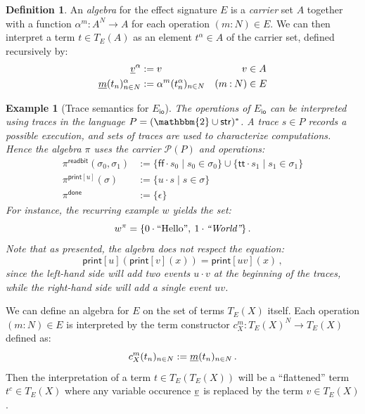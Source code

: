 \documentclass[11pt,oneside,draft]{book}
\newtheorem{example}[theorem]{Example}
\theoremstyle{definition}
\newtheorem{definition}[theorem]{Definition}
\newcommand{\kw}[1]{\ensuremath{ \mathsf{#1} }}
\newcommand{\ul}[1]{%
  \underline{\smash{#1}}
}
\begin{document}
\begin{definition} \label{def:algebra} %
An \emph{algebra}
for the effect signature $E$
is a \emph{carrier} set $A$
together with a function
$\alpha^m : A^N \rightarrow A$
for each operation $(m \mathbin{:} N) \in E$.
We can then interpret
a term $t \in T_E(A)$
as an element $t^\alpha \in A$ of the carrier set,
defined recursively by:
\begin{align*}
  \ul{v}^\alpha &:= v & v &\in A \\
  \ul{m}(t_n)_{n \in N}^\alpha &:=
    \alpha^m(t_n^\alpha)_{n \in N} & (m \mathbin{:} N) &\in E
\end{align*}
\end{definition}

\begin{example}[Trace semantics for $E_\kw{io}$] %
The operations of $E_\kw{io}$ can be interpreted using traces
in the language $P = (\mathbbm{2} \cup \kw{str})^*$.
A trace $s \in P$ records a possible execution,
and sets of traces are used to characterize computations.
Hence the algebra $\pi$ uses the carrier $\mathcal{P}(P)$
and operations:
\begin{align*}
  \pi^\kw{readbit}(\sigma_0, \sigma_1) &:=
    \{ \kw{ff} \cdot s_0 \mid s_0 \in \sigma_0 \} \cup
    \{ \kw{tt} \cdot s_1 \mid s_1 \in \sigma_1 \}
  \\
  \pi^{\kw{print}[u]}(\sigma) &:=
    \{ u \cdot s \mid s \in \sigma \}
  \\
  \pi^{\kw{done}} &:=
    \{ \epsilon \}
\end{align*}
For instance, the recurring example $w$ yields the set:
\[
  w^\pi =
  \{ 0 \cdot \text{\rm ``Hello''}, \: 1 \cdot \text{\em ``World''} \}
  \,.
\]
Note that as presented,
the algebra does not respect the equation:
\[
  \kw{print}[u](\kw{print}[v](x)) = \kw{print}[uv](x)
  \,,
\]
since the left-hand side will add two events $u \cdot v$
at the beginning of the traces,
while the right-hand side will add a single event $uv$.
\end{example}

We can define an algebra for $E$ on the set of terms $T_E(X)$ itself.
Each operation $(m \mathbin: N) \in E$ is interpreted
by the term constructor $c^m_X : T_E(X)^N \rightarrow T_E(X)$
defined as:
\[
  c^m_X(t_n)_{n \in N} := \ul{m}(t_n)_{n \in N}
  \,.
\]
Then the interpretation of a term $t \in T_E(T_E(X))$
will be a ``flattened'' term $t^c \in T_E(X)$ where any
variable occurence $\ul{v}$ is replaced by the term $v \in T_E(X)$.
\end{document}
